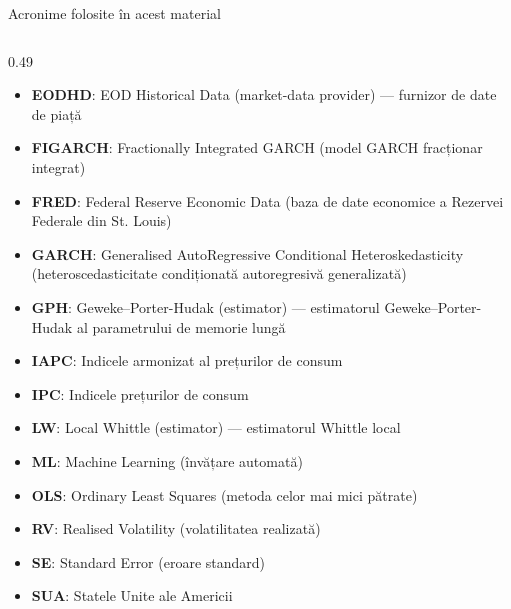 \begin{frame}{Acronime folosite în acest material}
\begin{columns}[T]
\begin{column}{0.49\textwidth}
\begin{itemize}\setlength{\itemsep}{0pt}
    \item \textbf{EODHD}: EOD Historical Data (market-data provider) — furnizor de date de piață
    \item \textbf{FIGARCH}: Fractionally Integrated GARCH (model GARCH fracționar integrat)
    \item \textbf{FRED}: Federal Reserve Economic Data (baza de date economice a Rezervei Federale din St. Louis)
    \item \textbf{GARCH}: Generalised AutoRegressive Conditional Heteroskedasticity (heteroscedasticitate condiționată autoregresivă generalizată)
    \item \textbf{GPH}: Geweke–Porter-Hudak (estimator) — estimatorul Geweke–Porter-Hudak al parametrului de memorie lungă
    \item \textbf{IAPC}: Indicele armonizat al prețurilor de consum
    \item \textbf{IPC}: Indicele prețurilor de consum
    \item \textbf{LW}: Local Whittle (estimator) — estimatorul Whittle local
    \item \textbf{ML}: Machine Learning (învățare automată)
    \item \textbf{OLS}: Ordinary Least Squares (metoda celor mai mici pătrate)
    \item \textbf{RV}: Realised Volatility (volatilitatea realizată)
    \item \textbf{SE}: Standard Error (eroare standard)
    \item \textbf{SUA}: Statele Unite ale Americii
\end{itemize}
\end{column}
\end{columns}
\end{frame}

